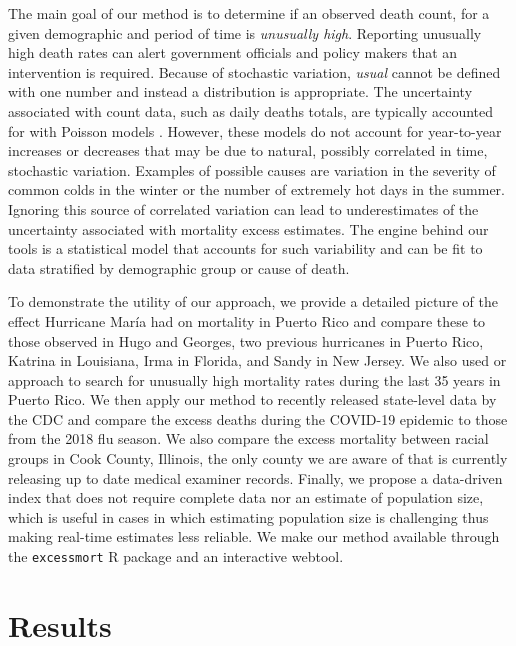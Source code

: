 \documentclass[11pt]{article}
\begin{document}
The main goal of our method is to determine if an observed death count, for a given demographic and period of time is \textit{unusually high}. Reporting unusually high death rates can alert government officials and policy makers that an intervention is required. Because of stochastic variation, \textit{usual} cannot be defined with one number and instead a distribution is appropriate. The uncertainty associated with count data, such as daily deaths totals, are typically accounted for with Poisson models \cite{mccullagh19831989, agresti2015foundations}. However, these models do not account for year-to-year increases or decreases that may be due to natural, possibly correlated in time, stochastic variation. Examples of possible causes are variation in the severity of common colds in the winter or the number of extremely hot days in the summer. Ignoring this source of correlated variation can lead to underestimates of the uncertainty associated with mortality excess estimates. The engine behind our tools is a statistical model that accounts for such variability and can be fit to data stratified by demographic group or cause of death. 

To demonstrate the utility of our approach, we provide a detailed picture of the effect Hurricane Mar\'ia had on mortality in Puerto Rico and compare these to those observed in Hugo and Georges, two previous hurricanes in Puerto Rico, Katrina in Louisiana, Irma in Florida, and Sandy in New Jersey. We also used or approach to search for unusually high mortality rates during the last 35 years in Puerto Rico. We then apply our method to recently released state-level data by the CDC and compare the excess deaths during the COVID-19 epidemic to those from the 2018 flu season. We also compare the excess mortality between racial groups in Cook County, Illinois, the only county we are aware of that is currently releasing up to date medical examiner records. Finally, we propose a data-driven index that does not require complete data nor an estimate of population size, which is useful in cases in which estimating population size is challenging thus making real-time estimates less reliable. We make our method available through the \verb+excessmort+ R package and an interactive webtool. \\

\section{Results}
\label{sec:results}
\end{document}

